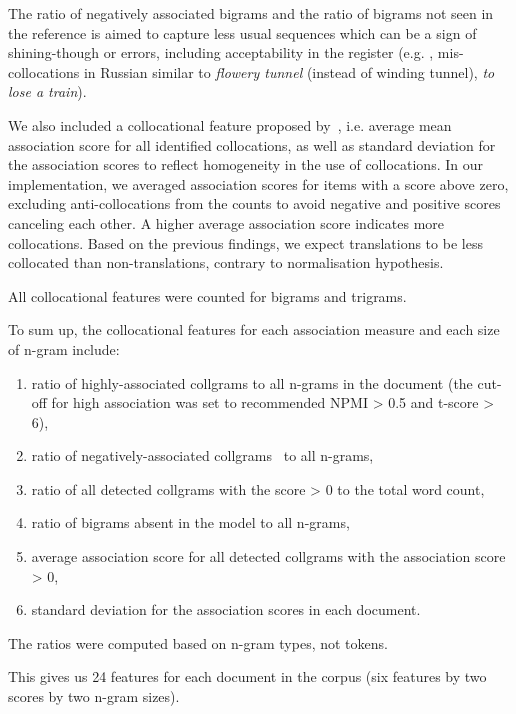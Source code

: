 The ratio of negatively associated bigrams and the ratio of bigrams not seen in the reference is aimed to capture less usual sequences which can be a sign of shining-though or errors, including acceptability in the register (e.g. , mis-collocations in Russian similar to \textit{flowery tunnel} (instead of winding tunnel), \textit{to lose a train}).

We also included a collocational feature proposed by~\citet{Volansky2011}, i.e. average mean association score for all identified collocations, as well as standard deviation for the association scores to reflect homogeneity in the use of collocations. In our implementation, we averaged association scores for items with a score above zero, excluding anti-collocations from the counts to avoid negative and positive scores canceling each other. A higher average association score indicates more collocations. 
Based on the previous findings, we expect translations to be less collocated than non-translations, contrary to normalisation hypothesis.  

All collocational features were counted for bigrams and trigrams.

To sum up, the collocational features for each association measure and each size of n-gram include: 

\label{pg:collgrams}
\begin{enumerate}\compresslist{}
	\item ratio of highly-associated collgrams to all n-grams in the document (the cut-off for high association was set to recommended \gls{NPMI} > 0.5 and t-score > 6),
	\item ratio of negatively-associated collgrams~\cite[anti-collocations,][]{Evert2009} to all n-grams,
	\item ratio of all detected collgrams with the score > 0 to the total word count,
	\item ratio of bigrams absent in the model to all n-grams,
	\item average association score for all detected collgrams with the association score > 0,
	\item standard deviation for the association scores in each document.
\end{enumerate}

The ratios were computed based on n-gram types, not tokens. 

This gives us 24 features for each document in the corpus (six features by two scores by two n-gram sizes).

